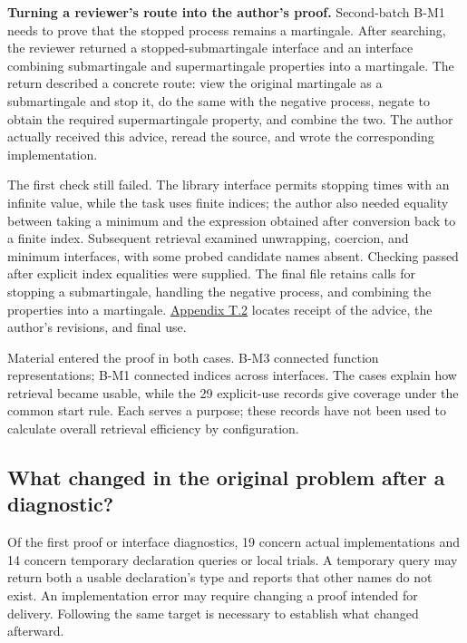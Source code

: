 \textbf{Turning a reviewer's route into the author's proof.} Second-batch B-M1 needs to prove that the stopped process remains a martingale. After searching, the reviewer returned a stopped-submartingale interface and an interface combining submartingale and supermartingale properties into a martingale. The return described a concrete route: view the original martingale as a submartingale and stop it, do the same with the negative process, negate to obtain the required supermartingale property, and combine the two. The author actually received this advice, reread the source, and wrote the corresponding implementation.

The first check still failed. The library interface permits stopping times with an infinite value, while the task uses finite indices; the author also needed equality between taking a minimum and the expression obtained after conversion back to a finite index. Subsequent retrieval examined unwrapping, coercion, and minimum interfaces, with some probed candidate names absent. Checking passed after explicit index equalities were supplied. The final file retains calls for stopping a submartingale, handling the negative process, and combining the properties into a martingale. \href{en-appendix.pdf\#t2}{Appendix T.2} locates receipt of the advice, the author's revisions, and final use.

Material entered the proof in both cases. B-M3 connected function representations; B-M1 connected indices across interfaces. The cases explain how retrieval became usable, while the 29 explicit-use records give coverage under the common start rule. Each serves a purpose; these records have not been used to calculate overall retrieval efficiency by configuration.

\subsection[What changed in the original problem after a diagnostic?]{\texorpdfstring{\protect\hypertarget{section-5-3}{}What changed in the original problem after a diagnostic?}{What changed in the original problem after a diagnostic?}}
Of the first proof or interface diagnostics, 19 concern actual implementations and 14 concern temporary declaration queries or local trials. A temporary query may return both a usable declaration's type and reports that other names do not exist. An implementation error may require changing a proof intended for delivery. Following the same target is necessary to establish what changed afterward.

